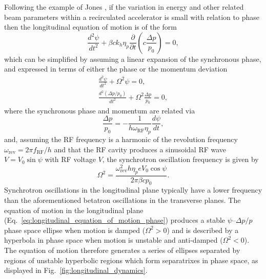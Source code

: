 \documentclass[../main.tex]{subfiles}
\begin{document}
Following the example of Jones \cite{jones2016design}, if the variation in energy and other related beam parameters within a recirculated accelerator is small with relation to phase then the longitudinal equation of motion is of the form 
\begin{equation}
\frac{d^{2}\psi}{dt^{2}} + \beta ck_{h}\eta_{p}\frac{\partial}{\partial t}\left(c\frac{\Delta p}{p_{0}}\right) = 0,
\label{eq:longitudinal_equation_of_motion}
\end{equation}
which can be simplified by assuming a linear expansion of the synchronous phase, and expressed in terms of either the phase or the momentum deviation
\begin{align}
\frac{d^{2}\psi}{dt^{2}} + \Omega^{2}\psi = 0,
\label{eq:longitudinal_equation_of_motion_phase} \\
\frac{d^{2}\left(\Delta p/p_{0}\right)}{dt^{2}} + \Omega^{2}\frac{\Delta p}{p_{0}} = 0,
\label{eq:longitudinal_equation_of_motion_momentum}
\end{align}
where the synchronous phase and momentum are related via
\begin{equation}
\frac{\Delta p}{p_{0}} = -\frac{1}{h\omega_{\mathrm{RF}}\eta_{p}}\frac{d\psi}{dt},
\label{eq:momentum_synchronous_phase_relation}    
\end{equation}
and, assuming the RF frequency is a harmonic of the revolution frequency $\omega_{\mathrm{rev}}=2\pi f_{\mathrm{RF}}/h$ and that the RF cavity produces a sinusoidal RF wave $V=V_{0}\sin\psi$ with RF voltage $V$, the synchrotron oscillation frequency is given by
\begin{equation}
\Omega^{2} = \frac{\omega_{\mathrm{rev}}^{2}h\eta_{p}eV_{0}\cos\psi}{2\pi\beta cp_{0}}.
\label{eq:synchrotron_oscillation_frequency}    
\end{equation}
Synchrotron oscillations in the longitudinal plane typically have a lower frequency than the aforementioned betatron oscillations in the transverse planes. The equation of motion in the longitudinal plane (Eq.~\ref{eq:longitudinal_equation_of_motion_phase}) produces a stable $\psi$--$\Delta p/p$ phase space ellipse when motion is damped ($\Omega^{2}>0$) and is described by a hyperbola in phase space when motion is unstable and anti-damped ($\Omega^{2}<0$). The equation of motion therefore generates a series of ellipses separated by regions of unstable hyperbolic regions which form separatrixes in phase space, as displayed in Fig.~\ref{fig:longitudinal_dynamics}.
\end{document}
